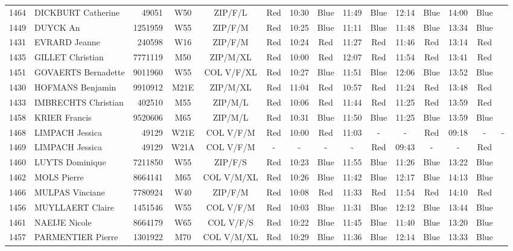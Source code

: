 \documentclass{report}
\begin{document}
\begin{longtable}{|c|l|r|c|c|*{5}{cc|}}
    1464 & DICKBURT Catherine & 49051 & W50 & ZIP/F/L & Red & 10:30 & Blue & 11:49 & Blue & 12:14 & Blue & 14:00 & Blue &  \\
    1449 & DUYCK An & 1251959 & W55 & ZIP/F/M & Red & 10:25 & Blue & 11:11 & Blue & 11:48 & Blue & 13:34 & Blue &  \\
    1431 & EVRARD Jeanne & 240598 & W16 & ZIP/F/M & Red & 10:24 & Red & 11:27 & Red & 11:46 & Red & 13:14 & Red &  \\
    1435 & GILLET Christian & 7771119 & M50 & ZIP/M/XL & Red & 10:00 & Red & 12:07 & Red & 11:54 & Red & 13:41 & Red &  \\
    1451 & GOVAERTS Bernadette & 9011960 & W55 & COL V/F/XL & Red & 10:27 & Blue & 11:51 & Blue & 12:06 & Blue & 13:52 & Blue &  \\
    1430 & HOFMANS Benjamin & 9910912 & M21E & ZIP/M/XL & Red & 11:04 & Red & 10:57 & Red & 11:24 & Red & 13:48 & Red &  \\
    1433 & IMBRECHTS Christian & 402510 & M55 & ZIP/M/L & Red & 10:06 & Red & 11:44 & Red & 11:25 & Red & 13:59 & Red &  \\
    1458 & KRIER Francis & 9520606 & M65 & ZIP/M/L & Red & 10:31 & Blue & 11:50 & Blue & 11:25 & Blue & 13:59 & Blue &  \\
    1468 & LIMPACH Jessica & 49129 & W21E & COL V/F/M & Red & 10:00 & Red & 11:03 & - &  - & Red & 09:18 & - &  -\\
    1469 & LIMPACH Jessica & 49129 & W21A & COL V/F/M & - &  - & - &  - & Red & 09:43 & - &  - & Red &  \\
    1460 & LUYTS Dominique & 7211850 & W55 & ZIP/F/S & Red & 10:23 & Blue & 11:55 & Blue & 11:26 & Blue & 13:22 & Blue &  \\
    1462 & MOLS Pierre & 8664141 & M65 & COL V/M/XL & Red & 10:26 & Blue & 11:42 & Blue & 12:17 & Blue & 14:13 & Blue &  \\
    1466 & MULPAS Vinciane & 7780924 & W40 & ZIP/F/M & Red & 10:08 & Red & 11:33 & Red & 11:54 & Red & 14:10 & Red &  \\
    1456 & MUYLLAERT Claire & 1451546 & W55 & COL V/F/M & Red & 10:03 & Blue & 11:31 & Blue & 12:12 & Blue & 13:44 & Blue &  \\
    1461 & NAEIJE Nicole & 8664179 & W65 & COL V/F/S & Red & 10:22 & Blue & 11:45 & Blue & 11:40 & Blue & 13:20 & Blue &  \\
    1457 & PARMENTIER Pierre & 1301922 & M70 & COL V/M/XL & Red & 10:29 & Blue & 11:36 & Blue & 12:14 & Blue & 13:33 & Blue &  \\

\end{longtable}
\end{document}
